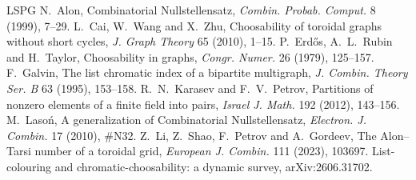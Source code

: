 \documentclass[11pt]{article}
\theoremstyle{plain}
\theoremstyle{definition}
\theoremstyle{remark}
\begin{document}
\begin{thebibliography}{LSPG}
 N.~Alon, Combinatorial Nullstellensatz, \emph{Combin. Probab. Comput.} 8 (1999),
7--29.
 L.~Cai, W.~Wang and X.~Zhu, Choosability of toroidal graphs without short
cycles, \emph{J. Graph Theory} 65 (2010), 1--15.
 P.~Erd\H{o}s, A.~L.~Rubin and H.~Taylor, Choosability in graphs,
\emph{Congr. Numer.} 26 (1979), 125--157.
 F.~Galvin, The list chromatic index of a bipartite multigraph, \emph{J. Combin.
Theory Ser. B} 63 (1995), 153--158.
 R.~N.~Karasev and F.~V.~Petrov, Partitions of nonzero elements of a finite field
into pairs, \emph{Israel J. Math.} 192 (2012), 143--156.
 M.~Laso\'n, A generalization of Combinatorial Nullstellensatz,
\emph{Electron. J. Combin.} 17 (2010), \#N32.
 Z.~Li, Z.~Shao, F.~Petrov and A.~Gordeev, The Alon--Tarsi number of a
toroidal grid, \emph{European J. Combin.} 111 (2023), 103697.
 List-colouring and chromatic-choosability: a dynamic survey, arXiv:2606.31702.
\end{thebibliography}
\end{document}
